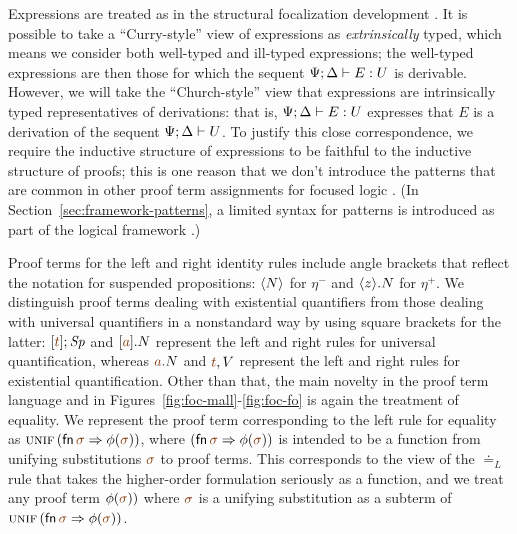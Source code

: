 Expressions are treated as in the structural focalization development
\cite{simmons11structural}. It is possible to take a ``Curry-style''
view of expressions as {\it extrinsically} typed, which means we
consider both well-typed and ill-typed expressions; the well-typed
expressions are then those for which the sequent
${\Psi}; {\Delta} \vdash {E} : {U}$ is derivable. However, we will take the
``Church-style'' view that expressions are intrinsically typed
representatives of derivations: that is, ${\Psi}; {\Delta} \vdash {E} : {U}$
expresses that $E$ is a derivation of the sequent
${\Psi};{\Delta} \vdash {U} \mathstrut$. To justify this close correspondence, we
require the inductive structure of expressions to be faithful to the
inductive structure of proofs; this is one reason that we
don't introduce the patterns that are common in other proof term
assignments for focused logic
\cite{watkins02concurrent,licata08focusing,krishnaswami09focusing}.
(In Section~\ref{sec:framework-patterns}, a limited syntax for patterns
is introduced as part of the logical framework \sls.)

Proof terms for the left and right identity rules include angle
brackets that reflect the notation for suspended propositions:
$\langle {N} \rangle$ for $\eta^-$ and $\langle {z} \rangle . {N}$ for $\eta^+$. We
distinguish proof terms dealing with existential quantifiers from those
dealing with universal quantifiers in a nonstandard way by using
square brackets for the latter: $\tforalll{\lf t}{\Sp}$ and
$\tforallr{\lf a}{N}$ represent the left and right rules for universal
quantification, whereas $\texistsl{\lf a}{N}$ and $\texistsr{\lf
  t}{V}$ represent the left and right rules for existential
quantification. Other than that, the main novelty in the proof term
language and in Figures~\ref{fig:foc-mall}-\ref{fig:foc-fo} is again
the treatment of equality.  We represent the proof term corresponding
to the left rule for equality as ${\textsc{unif}}\,({\sf
  fn}\,\lf{\sigma} \Rightarrow \phi(\lf\sigma))$, where $({\sf
  fn}\,\lf{\sigma} \Rightarrow \phi(\lf\sigma))$ is intended to be a
function from unifying substitutions $\lf\sigma$ to proof terms. This
corresponds to the view of the $\doteq_L$ rule that takes the
higher-order formulation seriously as a function, and we treat any
proof term $\phi(\lf\sigma))$ where $\lf\sigma$ is a unifying
substitution as a subterm of ${\textsc{unif}}\,({\sf fn}\,\lf{\sigma}
\Rightarrow \phi(\lf\sigma))$.

